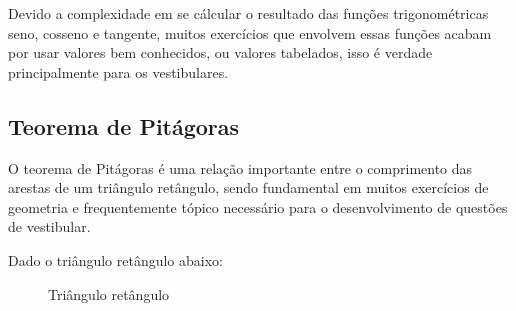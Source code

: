 \begin{multicols*}{2}
    Devido a complexidade em se cálcular o resultado das funções trigonométricas
    seno, cosseno e tangente, muitos exercícios que envolvem essas funções acabam
    por usar valores bem conhecidos, ou valores tabelados, isso é verdade
    principalmente para os vestibulares.

    \begin{table}[H]
        \renewcommand\arraystretch{2.5}
        \centering
        \caption{Tabela de ângulos notáveis}
        \label{tab:trig_val}
    \end{table}
 
    \subsection*{Teorema de Pitágoras}
    
    O teorema de Pitágoras é uma relação importante entre o comprimento das arestas 
    de um triângulo retângulo, sendo fundamental em muitos exercícios de geometria
    e frequentemente tópico necessário para o desenvolvimento de questões de 
    vestibular.

    \noindent
    Dado o triângulo retângulo abaixo:
    \begin{figure}[H]
        \centering
        \caption{Triângulo retângulo}
        \label{fig:tri_abc}
    \end{figure}


\end{multicols*}
